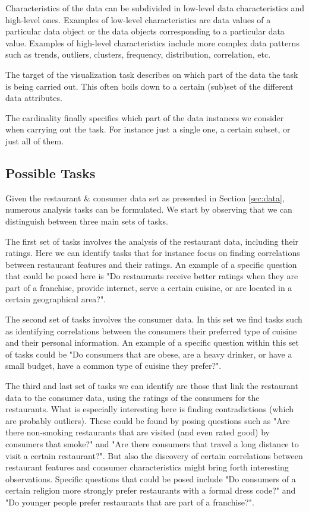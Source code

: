 Characteristics of the data can be subdivided in low-level data characteristics and high-level ones. Examples of low-level characteristics are data values of a particular data object or the data objects corresponding to a particular data value. Examples of high-level characteristics include more complex data patterns such as trends, outliers, clusters, frequency, distribution, correlation, etc.

The target of the visualization task describes on which part of the data the task is being carried out. This often boils down to a certain (sub)set of the different data attributes.

The cardinality finally specifies which part of the data instances we consider when carrying out the task. For instance just a single one, a certain subset, or just all of them.

\subsection{Possible Tasks}
Given the restaurant \& consumer data set as presented in Section \ref{sec:data}, numerous analysis tasks can be formulated. We start by observing that we can distinguish between three main sets of tasks. 

The first set of tasks involves the analysis of the restaurant data, including their ratings. Here we can identify tasks that for instance focus on finding correlations between restaurant features and their ratings. An example of a specific question that could be posed here is "Do restaurants receive better ratings when they are part of a franchise, provide internet, serve a certain cuisine, or are located in a certain geographical area?". 

The second set of tasks involves the consumer data. In this set we find tasks such as identifying correlations between the consumers their preferred type of cuisine and their personal information. An example of a specific question within this set of tasks could be "Do consumers that are obese, are a heavy drinker, or have a small budget, have a common type of cuisine they prefer?". 

The third and last set of tasks we can identify are those that link the restaurant data to the consumer data, using the ratings of the consumers for the restaurants. What is especially interesting here is finding contradictions (which are probably outliers). These could be found by posing questions such as "Are there non-smoking restaurants that are visited (and even rated good) by consumers that smoke?" and "Are there consumers that travel a long distance to visit a certain restaurant?". But also the discovery of certain correlations between restaurant features and consumer characteristics might bring forth interesting observations. Specific questions that could be posed include "Do consumers of a certain religion more strongly prefer restaurants with a formal dress code?" and "Do younger people prefer restaurants that are part of a franchise?".


